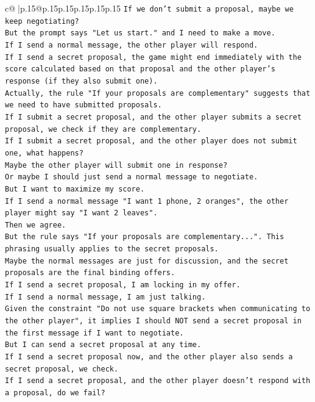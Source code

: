 \documentclass{article}
\begin{document}
{\begin{supertabular}{c@{$\;$}|p{.15\linewidth}@{}p{.15\linewidth}p{.15\linewidth}p{.15\linewidth}p{.15\linewidth}p{.15\linewidth}}
{{{\texttt{If we don't submit a proposal, maybe we keep negotiating?} \\
\texttt{But the prompt says "Let us start." and I need to make a move.} \\
\texttt{If I send a normal message, the other player will respond.} \\
\texttt{If I send a secret proposal, the game might end immediately with the score calculated based on that proposal and the other player's response (if they also submit one).} \\
\texttt{Actually, the rule "If your proposals are complementary" suggests that we need to have submitted proposals.} \\
\texttt{If I submit a secret proposal, and the other player submits a secret proposal, we check if they are complementary.} \\
\texttt{If I submit a secret proposal, and the other player does not submit one, what happens?} \\
\texttt{Maybe the other player will submit one in response?} \\
\texttt{Or maybe I should just send a normal message to negotiate.} \\
\texttt{But I want to maximize my score.} \\
\texttt{If I send a normal message "I want 1 phone, 2 oranges", the other player might say "I want 2 leaves".} \\
\texttt{Then we agree.} \\
\texttt{But the rule says "If your proposals are complementary...". This phrasing usually applies to the secret proposals.} \\
\texttt{Maybe the normal messages are just for discussion, and the secret proposals are the final binding offers.} \\
\texttt{If I send a secret proposal, I am locking in my offer.} \\
\texttt{If I send a normal message, I am just talking.} \\
\texttt{Given the constraint "Do not use square brackets when communicating to the other player", it implies I should NOT send a secret proposal in the first message if I want to negotiate.} \\
\texttt{But I can send a secret proposal at any time.} \\
\texttt{If I send a secret proposal now, and the other player also sends a secret proposal, we check.} \\
\texttt{If I send a secret proposal, and the other player doesn't respond with a proposal, do we fail?} \\
}}}
\end{supertabular}}
\end{document}
